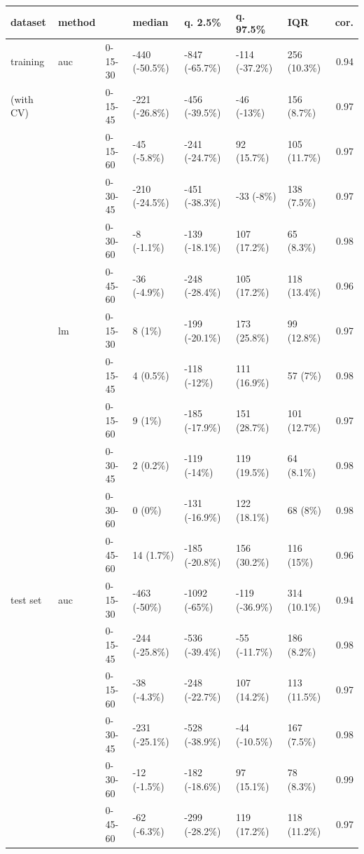 \documentclass[12pt]{article}
\begin{document}
\begin{table}[ht]
\begin{adjustwidth}{-1cm}{}
\centering
\begin{tabular}{lllllllr}
  \hline
dataset & method &  & median & q. 2.5\% & q. 97.5\% & IQR & cor. \\ 
  \hline
training & auc & 0-15-30 & -440 (-50.5\%) & -847 (-65.7\%) & -114 (-37.2\%) & 256 (10.3\%) & 0.94 \\ 
  (with CV) &  & 0-15-45 & -221 (-26.8\%) & -456 (-39.5\%) & -46 (-13\%) & 156 (8.7\%) & 0.97 \\ 
   &  & 0-15-60 & -45 (-5.8\%) & -241 (-24.7\%) & 92 (15.7\%) & 105 (11.7\%) & 0.97 \\ 
   &  & 0-30-45 & -210 (-24.5\%) & -451 (-38.3\%) & -33 (-8\%) & 138 (7.5\%) & 0.97 \\ 
   &  & 0-30-60 & -8 (-1.1\%) & -139 (-18.1\%) & 107 (17.2\%) & 65 (8.3\%) & 0.98 \\ 
   &  & 0-45-60 & -36 (-4.9\%) & -248 (-28.4\%) & 105 (17.2\%) & 118 (13.4\%) & 0.96 \\ [1mm]
   & lm & 0-15-30 & 8 (1\%) & -199 (-20.1\%) & 173 (25.8\%) & 99 (12.8\%) & 0.97 \\ 
   &  & 0-15-45 & 4 (0.5\%) & -118 (-12\%) & 111 (16.9\%) & 57 (7\%) & 0.98 \\ 
   &  & 0-15-60 & 9 (1\%) & -185 (-17.9\%) & 151 (28.7\%) & 101 (12.7\%) & 0.97 \\ 
   &  & 0-30-45 & 2 (0.2\%) & -119 (-14\%) & 119 (19.5\%) & 64 (8.1\%) & 0.98 \\ 
   &  & 0-30-60 & 0 (0\%) & -131 (-16.9\%) & 122 (18.1\%) & 68 (8\%) & 0.98 \\ 
   &  & 0-45-60 & 14 (1.7\%) & -185 (-20.8\%) & 156 (30.2\%) & 116 (15\%) & 0.96 \\ [3mm]
  test set & auc & 0-15-30 & -463 (-50\%) & -1092 (-65\%) & -119 (-36.9\%) & 314 (10.1\%) & 0.94 \\ 
   &  & 0-15-45 & -244 (-25.8\%) & -536 (-39.4\%) & -55 (-11.7\%) & 186 (8.2\%) & 0.98 \\ 
   &  & 0-15-60 & -38 (-4.3\%) & -248 (-22.7\%) & 107 (14.2\%) & 113 (11.5\%) & 0.97 \\ 
   &  & 0-30-45 & -231 (-25.1\%) & -528 (-38.9\%) & -44 (-10.5\%) & 167 (7.5\%) & 0.98 \\ 
   &  & 0-30-60 & -12 (-1.5\%) & -182 (-18.6\%) & 97 (15.1\%) & 78 (8.3\%) & 0.99 \\ 
   &  & 0-45-60 & -62 (-6.3\%) & -299 (-28.2\%) & 119 (17.2\%) & 118 (11.2\%) & 0.97 \\ 

\end{tabular}
\end{adjustwidth}
\end{table}
\end{document}
